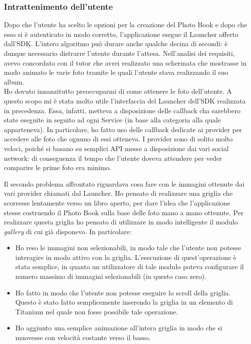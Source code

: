			\subsubsection{Intrattenimento dell'utente}
				Dopo che l'utente ha scelto le opzioni per la creazione del Photo Book e dopo che esso si è autenticato in modo
				corretto, l'applicazione esegue il Launcher offerto dall'SDK. L'intero algoritmo può durare anche qualche decina di
				secondi: è dunque necessario distrarre l'utente durante l'attesa. Nell'analisi dei requisiti, avevo concordato
				con il tutor che avrei realizzato una schermata che mostrasse in modo animato le varie foto tramite le quali
				l'utente stava realizzando il suo album.\\
				Ho dovuto innanzitutto preoccuparmi di come ottenere le foto dell'utente. A questo scopo mi è stata molto utile
				l'interfaccia del Launcher dell'SDK realizzata in precedenza. Essa, infatti, metteva a disposizione delle callback
				cha sarebbero state eseguite in seguito ad ogni Service (in base alla categoria alla quale apparteneva). In
				particolare, ho fatto uso delle callback dedicate ai provider per accedere alle foto che ognuno di essi otteneva. I
				provider sono di solito molto veloci, poiché si basano su semplici API messe a disposizione dai vari social network:
				di conseguenza il tempo che l'utente doveva attendere per veder comparire le prime foto era minimo.
				
				Il secondo problema affrontato riguardava cosa fare con le immagini ottenute dai vari provider chiamati dal Launcher.
				Ho pensato di realizzare una griglia che scorresse lentamente verso un libro aperto, per dare l'idea che
				l'applicazione stesse costruendo il Photo Book sulla base delle foto mano a mano ottenute. Per realizzare questa
				griglia ho pensato di utilizzare in modo intelligente il modulo \emph{gallery} di cui già disponevo. In particolare:
				\begin{itemize}
					\item Ho reso le immagini non selezionabili, in modo tale che l'utente non potesse interagire in modo attivo
					con la griglia. L'esecuzione di quest'operazione è stata semplice, in quanto un utilizzatore di tale modulo
					poteva configurare il numero massimo di immagini selezionabili (in questo caso zero).
					\item Ho fatto in modo che l'utente non potesse eseguire lo scroll della griglia. Questo è stato fatto
					semplicemente inserendo la griglia in un elemento di Titanium nel quale non fosse possibile tale operazione.
					\item Ho aggiunto una semplice animazione all'intera griglia in modo che si muovesse con velocità costante
					verso il basso.
				\end{itemize}

